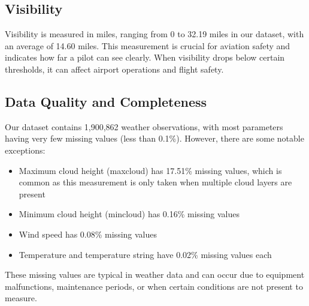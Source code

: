 \subsection{Visibility}
Visibility is measured in miles, ranging from 0 to 32.19 miles in our dataset, with an average of 14.60 miles. This measurement is crucial for aviation safety and indicates how far a pilot can see clearly. When visibility drops below certain thresholds, it can affect airport operations and flight safety.

\subsection{Data Quality and Completeness}
Our dataset contains 1,900,862 weather observations, with most parameters having very few missing values (less than 0.1\%). However, there are some notable exceptions:\begin{itemize}
  \item Maximum cloud height (maxcloud) has 17.51\% missing values, which is common as this measurement is only taken when multiple cloud layers are present
  \item Minimum cloud height (mincloud) has 0.16\% missing values
  \item Wind speed has 0.08\% missing values
  \item Temperature and temperature string have 0.02\% missing values each
\end{itemize}
These missing values are typical in weather data and can occur due to equipment malfunctions, maintenance periods, or when certain conditions are not present to measure.

